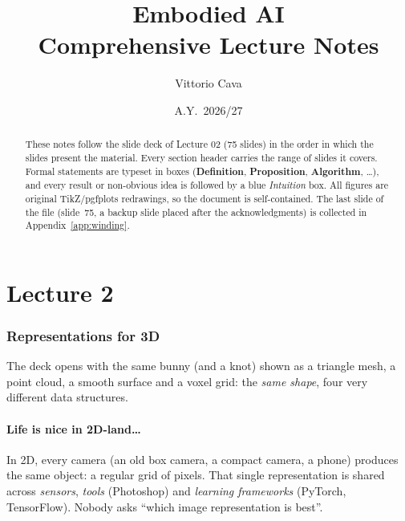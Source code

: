 \documentclass[11pt,a4paper]{article}
\title{\textbf{Embodied AI}\\[6pt]\large Comprehensive Lecture Notes}
\author{Vittorio Cava}
\date{A.Y.~2026/27}
\theoremstyle{definition}
\theoremstyle{plain}
\theoremstyle{remark}
\begin{document}
\maketitle
\tableofcontents
\newpage

\setcounter{section}{0}
\renewcommand{\thesection}{\arabic{section}}
\part{Lecture 2}

\begin{abstract}
\noindent These notes follow the slide deck of Lecture 02 (75 slides) in the order in which the slides present the material. Every section header carries the range of slides it covers. Formal statements are typeset in boxes (\textbf{Definition}, \textbf{Proposition}, \textbf{Algorithm}, \dots), and every result or non-obvious idea is followed by a blue \emph{Intuition} box. All figures are original TikZ/pgfplots redrawings, so the document is self-contained. The last slide of the file (slide~75, a backup slide placed after the acknowledgments) is collected in Appendix~\ref{app:winding}.
\end{abstract}


\newpage

\section{Representations for 3D }

The deck opens with the same bunny (and a knot) shown as a triangle mesh, a point cloud, a smooth surface and a voxel grid: the \emph{same shape}, four very different data structures.

\subsection*{Life is nice in 2D-land\dots\ }
In 2D, every camera (an old box camera, a compact camera, a phone) produces the same object: a regular grid of pixels. That single representation is shared across \emph{sensors}, \emph{tools} (Photoshop) and \emph{learning frameworks} (PyTorch, TensorFlow). Nobody asks ``which image representation is best''.
\end{document}
